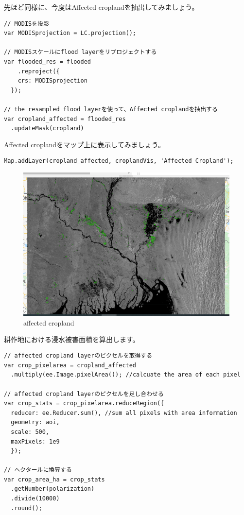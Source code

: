 \documentclass[
]{book}
\begin{document}
先ほど同様に、今度はAffected croplandを抽出してみましょう。

\begin{verbatim}
// MODISを投影
var MODISprojection = LC.projection();

// MODISスケールにflood layerをリプロジェクトする
var flooded_res = flooded
    .reproject({
    crs: MODISprojection
  });

// the resampled flood layerを使って、Affected croplandを抽出する
var cropland_affected = flooded_res
  .updateMask(cropland)
\end{verbatim}

Affected croplandをマップ上に表示してみましょう。

\begin{verbatim}
Map.addLayer(cropland_affected, croplandVis, 'Affected Cropland');
\end{verbatim}

\begin{figure}
\centering
\includegraphics{images/affected cropland.png}
\caption{affected cropland}
\end{figure}

耕作地における浸水被害面積を算出します。

\begin{verbatim}
// affected cropland layerのピクセルを取得する
var crop_pixelarea = cropland_affected
  .multiply(ee.Image.pixelArea()); //calcuate the area of each pixel 

// affected cropland layerのピクセルを足し合わせる
var crop_stats = crop_pixelarea.reduceRegion({
  reducer: ee.Reducer.sum(), //sum all pixels with area information                
  geometry: aoi,
  scale: 500,
  maxPixels: 1e9
  });
  
// ヘクタールに換算する
var crop_area_ha = crop_stats
  .getNumber(polarization)
  .divide(10000)
  .round();
\end{verbatim}
\end{document}
